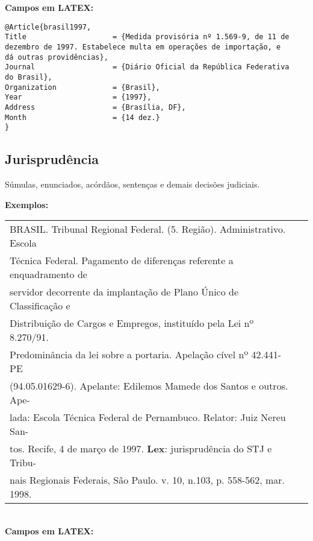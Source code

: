 \textbf{Campos em LATEX:} 
	
\begingroup
\fontsize{10pt}{12pt}\selectfont
\begin{verbatim}
@Article{brasil1997,
Title                    = {Medida provisória nº 1.569-9, de 11 de 
dezembro de 1997. Estabelece multa em operações de importação, e 
dá outras providências},
Journal                  = {Diário Oficial da República Federativa 
do Brasil},
Organization             = {Brasil},
Year                     = {1997},
Address                  = {Brasília, DF},
Month                    = {14 dez.}
}

\end{verbatim}
\endgroup
\subsection{Jurisprudência}
	
Súmulas, enunciados, acórdãos, sentenças e demais decisões judiciais. 
	
\textbf{Exemplos:} \\
	
\begin{tabular}{|l|c|} \hline
	BRASIL. Tribunal Regional Federal. (5. Região). Administrativo. Escola         \\
	Técnica Federal. Pagamento de diferenças referente a enquadramento de         \\
	servidor decorrente da implantação de Plano Único de Classificação e       \\
	Distribuição de Cargos e Empregos, instituído pela Lei nº 8.270/91.         \\
	Predominância da lei sobre a portaria. Apelação cível nº 42.441-PE         \\
	(94.05.01629-6). Apelante: Edilemos Mamede dos Santos e outros. Ape-            \\
	lada: Escola Técnica Federal de Pernambuco. Relator: Juiz Nereu San-           \\
	tos. Recife, 4 de março de 1997. \textbf{Lex}: jurisprudência do STJ e Tribu- \\
	nais Regionais Federais, São Paulo. v. 10, n.103, p. 558-562, mar. 1998.       \\\hline
\end{tabular} \\
	
\textbf{Campos em LATEX:} 
	
